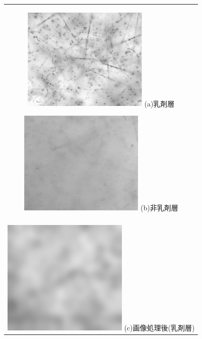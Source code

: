 \documentclass[12pt,a4paper]{jarticle}
\begin{document}
\begin{figure}[htbp]
  \centering
      \begin{tabular}{c}
        \begin{minipage}{0.5\hsize}
          \centering
            \includegraphics[clip, width=60mm]{emulsion_in.png}
            \hspace{1.6cm} (a)乳剤層
        \end{minipage}
        
        \begin{minipage}{0.5\hsize}
          \centering
            \includegraphics[clip, width=60mm]{emulsion_out.png}
            \hspace{1.6cm} (b)非乳剤層
        \end{minipage}
        \\
        \\
        \begin{minipage}{0.5\hsize}
          \centering
              \includegraphics[clip, width=60mm]{gau2.png}
              \hspace{1.6cm} (c)画像処理後(乳剤層)
          \end{minipage}
          

\end{tabular}
\end{figure}
\end{document}
